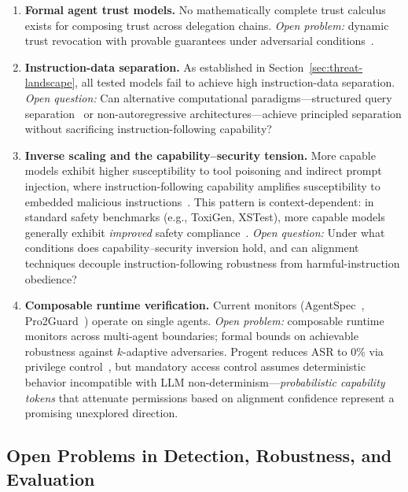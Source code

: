 \begin{enumerate}[nosep,leftmargin=1.5em]
    \item \textbf{Formal agent trust models.} No mathematically complete trust calculus exists for composing trust across delegation chains. \emph{Open problem:} dynamic trust revocation with provable guarantees under adversarial conditions~\cite{trustparadox2025,rodriguez2025did}.
    \item \textbf{Instruction-data separation.} As established in Section~\ref{sec:threat-landscape}, all tested models fail to achieve high instruction-data separation. \emph{Open question:} Can alternative computational paradigms---structured query separation~\cite{chen2025struq} or non-autoregressive architectures---achieve principled separation without sacrificing instruction-following capability?
    \item \textbf{Inverse scaling and the capability--security tension.} More capable models exhibit higher susceptibility to tool poisoning and indirect prompt injection, where instruction-following capability amplifies susceptibility to embedded malicious instructions~\cite{wang2025mcptox,yi2025bipia}. This pattern is context-dependent: in standard safety benchmarks (e.g., ToxiGen, XSTest), more capable models generally exhibit \emph{improved} safety compliance~\cite{rottger2024xstest}. \emph{Open question:} Under what conditions does capability--security inversion hold, and can alignment techniques decouple instruction-following robustness from harmful-instruction obedience?
    \item \textbf{Composable runtime verification.} Current monitors (AgentSpec~\cite{wang2025agentspec}, Pro2Guard~\cite{pro2guard2025}) operate on single agents. \emph{Open problem:} composable runtime monitors across multi-agent boundaries; formal bounds on achievable robustness against $k$-adaptive adversaries. Progent reduces ASR to 0\% via privilege control~\cite{shi2025progent}, but mandatory access control assumes deterministic behavior incompatible with LLM non-determinism---\emph{probabilistic capability tokens} that attenuate permissions based on alignment confidence represent a promising unexplored direction.
\end{enumerate}


\subsection{Open Problems in Detection, Robustness, and Evaluation}
\label{sec:future-open}

